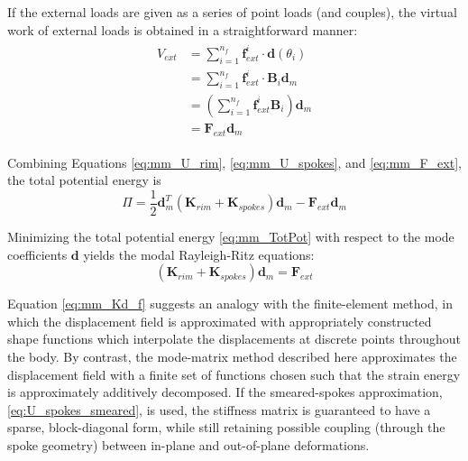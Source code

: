 \documentclass[\rootdir/thesis.tex]{subfiles}
\begin{document}
If the external loads are given as a series of point loads (and couples), the virtual work of external loads is obtained in a straightforward manner:
\begin{align}
\label{eq:mm_F_ext}
\begin{split}
V_{ext} &= \sum_{i=1}^{n_f} \mathbf{f}_{ext}^i \cdot \mathbf{d}(\theta_i) \\
&= \sum_{i=1}^{n_f} \mathbf{f}_{ext}^i \cdot \mathbf{B}_i \mathbf{d}_m\\
&= \left(\sum_{i=1}^{n_f} \mathbf{f}_{ext}^i \mathbf{B}_i \right) \mathbf{d}_m\\
&= \mathbf{F}_{ext}\mathbf{d}_m
\end{split}
\end{align}

Combining Equations \eqref{eq:mm_U_rim}, \eqref{eq:mm_U_spokes}, and \eqref{eq:mm_F_ext}, the total potential energy is
\begin{equation}
\label{eq:mm_TotPot}
\Pi = \frac{1}{2} \mathbf{d}_m^T \left( \mathbf{K}_{rim} + \mathbf{K}_{spokes} \right) \mathbf{d}_m - \mathbf{F}_{ext}\mathbf{d}_m
\end{equation}

Minimizing the total potential energy \eqref{eq:mm_TotPot} with respect to the mode coefficients $\mathbf{d}$ yields the modal Rayleigh-Ritz equations:
\begin{equation}
\label{eq:mm_Kd_f}
\left( \mathbf{K}_{rim} + \mathbf{K}_{spokes} \right) \mathbf{d}_m = \mathbf{F}_{ext}
\end{equation}

Equation \eqref{eq:mm_Kd_f} suggests an analogy with the finite-element method, in which the displacement field is approximated with appropriately constructed shape functions which interpolate the displacements at discrete points throughout the body. By contrast, the mode-matrix method described here approximates the displacement field with a finite set of functions chosen such that the strain energy is approximately additively decomposed. If the smeared-spokes approximation, \eqref{eq:U_spokes_smeared}, is used, the stiffness matrix is guaranteed to have a sparse, block-diagonal form, while still retaining possible coupling (through the spoke geometry) between in-plane and out-of-plane deformations.
\end{document}
